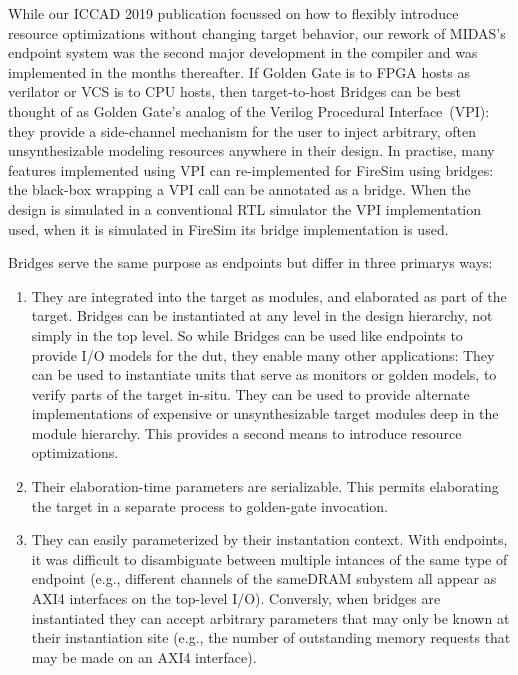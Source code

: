 While our ICCAD 2019 publication focussed on how to flexibly introduce resource
optimizations without changing target behavior, our rework of MIDAS's endpoint
system was the second major development in the compiler and was implemented in
the months thereafter. If Golden Gate is to FPGA hosts as verilator or VCS is
to CPU hosts, then target-to-host Bridges can be best thought of as Golden
Gate's analog of the Verilog Procedural Interface~(VPI): they provide a
side-channel mechanism for the user to inject arbitrary, often unsynthesizable
modeling resources anywhere in their design. In practise, many features
implemented using VPI can re-implemented for FireSim using bridges: the
black-box wrapping a VPI call can be annotated as a bridge. When the design is
simulated in a conventional RTL simulator the VPI implementation used, when it
is simulated in FireSim its bridge implementation is used.

Bridges serve the same purpose as endpoints but differ in three primarys ways:
\begin{enumerate}
    \item They are integrated into the target as modules, and elaborated as
        part of the target.  Bridges can be instantiated at any level in the
        design hierarchy, not simply in the top level.  So while Bridges can be
        used like endpoints to provide I/O models for the dut, they enable many
        other applications: They can be used to instantiate units that serve as
        monitors or golden models, to verify parts of the target in-situ. They
        can be used to provide alternate implementations of expensive or
        unsynthesizable target modules deep in the module hierarchy. This
        provides a second means to introduce resource optimizations.


    \item Their elaboration-time parameters are serializable. This permits elaborating 
        the target in a separate process to golden-gate invocation.

    \item They can easily parameterized by their instantation context. With
        endpoints, it was difficult to disambiguate between multiple intances
        of the same type of endpoint (e.g., different channels of the sameDRAM
        subystem all appear as AXI4 interfaces on the top-level I/O). Conversly,
        when bridges are instantiated they can accept arbitrary parameters that
        may only be known at their instantiation site (e.g., the number of
        outstanding memory requests that may be made on an AXI4 interface).
\end{enumerate}

